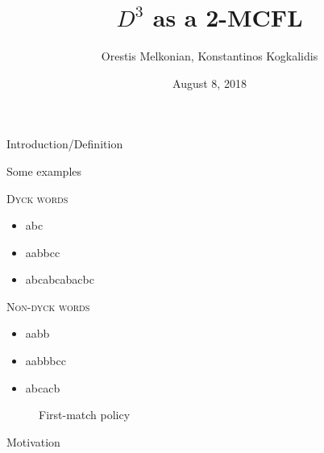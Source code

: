 \documentclass{beamer}
\title{$D^3$ as a 2-MCFL}
\subtitle{}
\author{Orestis Melkonian, Konstantinos Kogkalidis}
\date{August 8, 2018}
\institute{Utrecht University}
\begin{document}
	\maketitle

	\begin{frame}{Introduction/Definition}
	\end{frame}
	
	\begin{frame}{Some examples}
		\hspace{1cm}
		\begin{minipage}{.4\textwidth}
		\textsc{Dyck words}
		\begin{itemize}
			\item \textcolor{ggreen}{abc}
			\item \textcolor{ggreen}{aabbcc}
			\item \textcolor{ggreen}{abcabcabacbc}
		\end{itemize}
		\end{minipage}
		\pause
		\begin{minipage}{.4\textwidth}
		\textsc{Non-dyck words}
		\begin{itemize}
			\item \textcolor{rred}{aabb}
			\pause
			\item \textcolor{rred}{aabbbcc}
			\pause
			\item \textcolor{rred}{abcacb}
		\end{itemize}
		\end{minipage}
		\vspace{1cm}
		\pause
		\begin{figure}[h!]
		\centering
		
		\caption*{First-match policy}
		\end{figure}
	\end{frame}
	
	
	\begin{frame}{Motivation}
	\begin{center}
	\end{center}
	\end{frame}
\end{document}
